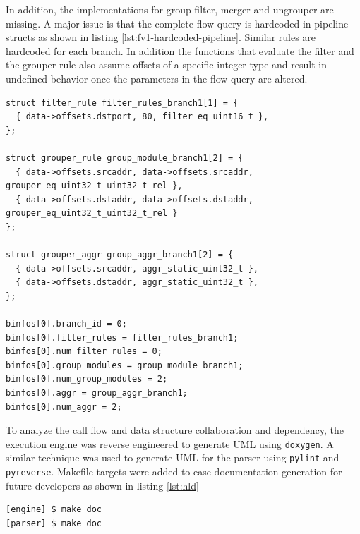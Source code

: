 In addition, the implementations for group filter, merger and ungrouper are
missing. A major issue is that the complete flow query is hardcoded in
pipeline 
structs as shown in listing \ref{lst:fv1-hardcoded-pipeline}. Similar rules
are hardcoded for each branch. In addition the functions that evaluate the
filter and the grouper rule also assume offsets of a specific integer type and
result in undefined behavior once the parameters in the flow query are
altered.

\begin{lstlisting}
struct filter_rule filter_rules_branch1[1] = {
  { data->offsets.dstport, 80, filter_eq_uint16_t },
};

struct grouper_rule group_module_branch1[2] = {
  { data->offsets.srcaddr, data->offsets.srcaddr, grouper_eq_uint32_t_uint32_t_rel },
  { data->offsets.dstaddr, data->offsets.dstaddr, grouper_eq_uint32_t_uint32_t_rel }
};

struct grouper_aggr group_aggr_branch1[2] = {
  { data->offsets.srcaddr, aggr_static_uint32_t },
  { data->offsets.dstaddr, aggr_static_uint32_t },
};

binfos[0].branch_id = 0;
binfos[0].filter_rules = filter_rules_branch1;
binfos[0].num_filter_rules = 0;
binfos[0].group_modules = group_module_branch1;
binfos[0].num_group_modules = 2;
binfos[0].aggr = group_aggr_branch1;
binfos[0].num_aggr = 2;
\end{lstlisting}

To analyze the call flow and data structure collaboration and dependency, the
execution engine was reverse engineered to generate \ac{UML} using
\texttt{doxygen}.   A similar technique was
used to generate \ac{UML} for the parser using \texttt{pylint} and
\texttt{pyreverse}. Makefile targets were added to ease documentation
generation for future developers as shown in listing \ref{lst:hld}

\begin{lstlisting}
[engine] $ make doc
[parser] $ make doc
\end{lstlisting}

